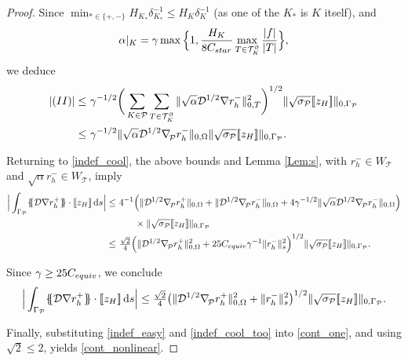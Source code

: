 \documentclass[10pt,a4paper]{amsart}
\newcommand\calP{{\mathcal{P}}}
\newcommand\calT{{\mathcal{T}}}
\newcommand{\bnabla}{\nabla_{\kern-.05cm\mesh}^{}}
\newcommand{\jump}[1]{[\![#1]\!]}                        %
\newcommand{\mean}[1]{\{\kern-1.1mm\{#1\}\kern-1.1mm\}}
\newcommand{\mesh}{\calP}
\newcommand{\norm}[2]{\|{#1}\|_{{#2}}}
\newcommand{\ud}{\,\mathrm{d}}
\renewcommand{\k}{K}
\begin{document}
\begin{proof}
Since $\min_{*\in\{+,-\}}H_{\k_*}\delta_{\k_*}^{-1}\le H_\k\delta_{\k}^{-1}$ (as one of the $\k_*$ is $\k$ itself), and
\[
\alpha|_\k= \gamma \max\Big\{1,\frac{ H_{\k}}{8C_{\rm star}}\max_{T\in\calT_\k^\partial}\frac{|f|}{|T|}\Big\},
\]
we deduce
\begin{align}\label{cool_minus}
|(II)|
\le&\ \gamma^{-1/2}\bigg(\sum_{\k\in\mesh}\sum_{T\in \mathcal{T}_\k^\partial}
\norm{\sqrt{\alpha}\mathcal{D}^{1/2}\nabla r_h^-}{0,T}^2\bigg)^{1/2}
\norm{\sqrt{\sigma_\calP}\jump{z_H}}{0,\Gamma_{\calP}}\\
\le&\
\gamma^{-1/2}\norm{\sqrt{\alpha}\mathcal{D}^{1/2}\bnabla r_h^-}{0,\Omega}
\norm{\sqrt{\sigma_\calP}\jump{z_H}}{0,\Gamma_{\calP}}.\nonumber
\end{align}

Returning to \eqref{indef_cool}, the above bounds and Lemma
\ref{Lem:s}, with $r_h^-\in W_\calT$ and $\sqrt{\alpha}r_h^-\in
W_\calT$, imply
\[
\begin{aligned}
\Big|	\int_{\Gamma_{\calP}}\mean{\mathcal{D}\nabla r_h^+}\cdot\jump{z_H}\ud s\Big|
\le&\  4^{-1}\Big(\norm{\mathcal{D}^{1/2}\bnabla r_h^+}{0,\Omega}
+\norm{\mathcal{D}^{1/2}\bnabla r_h^-}{0,\Omega}
+4\gamma^{-1/2}\norm{\sqrt{\alpha}\mathcal{D}^{1/2}\bnabla r_h^-}{0,\Omega}\Big)
\\
&
\qquad \times\norm{\sqrt{\sigma_\calP}\jump{z_H}}{0,\Gamma_{\calP}}\\
\le&\  \tfrac{\sqrt{2}}{4}\Big(\norm{ \mathcal{D}^{1/2}\bnabla r_h^+}{0,\Omega}^2
+ 25 C_{\rm equiv}\gamma^{-1}\norm{ r_h^-}{s}^2\Big)^{1/2}
\norm{\sqrt{\sigma_\calP}\jump{z_H}}{0,\Gamma_{\calP}}.
\end{aligned}
\]

Since $\gamma\ge 25C_{\rm equiv}$, we conclude
\begin{equation}\label{indef_cool_too}
\Big|\int_{\Gamma_{\calP}}\mean{\mathcal{D}\nabla r_h^+}\cdot\jump{z_H}\ud s\Big|
\le 
\tfrac{\sqrt{2}}{4}\big(\norm{\mathcal{D}^{1/2}\bnabla r_h^+}{0,\Omega}^2
+\norm{r_h^-}{s}^2\big)^{1/2}
\norm{\sqrt{\sigma_\calP}\jump{z_H}}{0,\Gamma_{\calP}}.
\end{equation}

Finally, substituting \eqref{indef_easy} and \eqref{indef_cool_too}
into \eqref{cont_one}, and using $\sqrt{2}\le 2$, yields
\eqref{cont_nonlinear}.
\end{proof}
\end{document}

